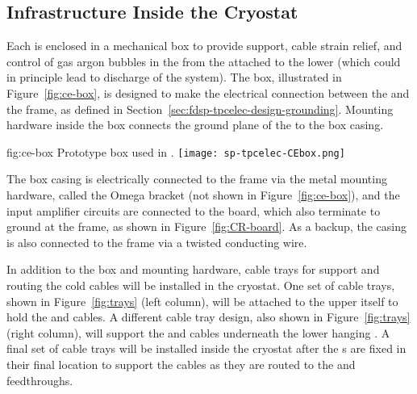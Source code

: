 \subsection{Infrastructure Inside the Cryostat}
\label{sec:fdsp-tpcelec-design-infrastructure}

Each  is enclosed in a mechanical  box 
to provide support, cable strain relief, and control of gas 
argon bubbles in the  from the  attached 
to the lower  (which could in principle lead to 
discharge of the  system). The  box, 
illustrated in Figure~\ref{fig:ce-box}, is designed to make the 
electrical connection between the  and the  
frame, as defined in Section~\ref{sec:fdsp-tpcelec-design-grounding}.
Mounting hardware inside the  box connects the ground plane 
of the  to the box casing.


\begin{dunefigure}
{fig:ce-box}
{Prototype  box used in .}
\texttt{[image: sp-tpcelec-CEbox.png]}
\end{dunefigure}

The  box casing is electrically connected to the 
 frame via the metal mounting hardware, called the 
Omega bracket (not shown in Figure~\ref{fig:ce-box}), and the 
input amplifier circuits are connected to the  board, 
which also terminate to ground at the  frame, as 
shown in Figure~\ref{fig:CR-board}. As a backup, the casing is 
also connected to the  frame via a twisted conducting wire.


In addition to the  box and mounting hardware, cable trays 
for support and routing the cold cables will be installed in the 
cryostat. One set of cable trays, shown in Figure~\ref{fig:trays} 
(left column), will be attached to the upper  itself 
to hold the  and  cables. A different cable 
tray design, also shown in Figure~\ref{fig:trays} (right column), 
will support the  and  cables underneath the 
lower hanging . A final set of cable trays will be 
installed inside the cryostat after the s are 
fixed in their final location to support the cables as they are 
routed to the  and  feedthroughs.

